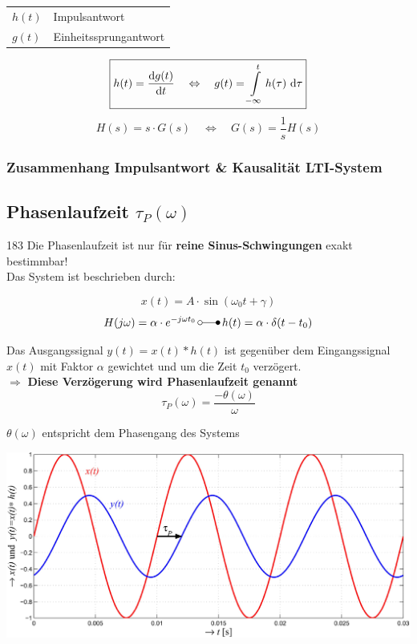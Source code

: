 \begin{tabular}{ll}
    $h(t)$ & Impulsantwort \\
    $g(t)$ & Einheitssprungantwort
\end{tabular}

$$ \boxed{ h(t) =  \frac{\mathop{} \! \mathrm{d} g(t)}{\mathop{} \! \mathrm{d} t}  \quad \Leftrightarrow \quad g(t) = \int\limits_{-\infty}^t  h(\tau) \, \mathop{} \! \mathrm{d} \tau }  $$
$$ \boxed{ H(s) = s \cdot G(s) \quad \Leftrightarrow \quad G(s) =  \frac{1}{s} H(s) }  $$


\subsubsection{Zusammenhang Impulsantwort \& Kausalität LTI-System}



\subsection{Phasenlaufzeit \texorpdfstring{$\tau_P(\omega)$}{tP(w)}}{183}
Die Phasenlaufzeit ist nur für \textbf{reine Sinus-Schwingungen} exakt bestimmbar! \\
Das System ist beschrieben durch:

$$ x(t) = A \cdot \sin(\omega_0 t + \gamma) $$
$$ H( j \omega) = \alpha \cdot e^{- j \omega t_0} \, \laplace \, h(t) = \alpha \cdot \delta(t - t_0) $$


Das Ausgangssignal $y(t) = x(t) * h(t)$ ist gegenüber dem Eingangssignal $x(t)$ mit Faktor $\alpha$ gewichtet und 
um die Zeit $t_0$ verzögert. \\
$\Rightarrow$ \textbf{Diese Verzögerung wird Phasenlaufzeit genannt}
$$ \boxed{ \tau_P(\omega) = \frac{- \theta(\omega)}{\omega} } $$

$ \theta(\omega)$ entspricht dem Phasengang des Systems 


\includegraphics[width=0.8\linewidth]{images/phasenlaufzeit.png}



